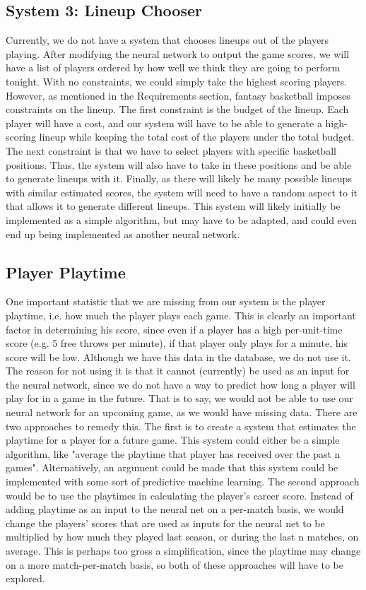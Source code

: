 \subsection{System 3: Lineup Chooser}
Currently, we do not have a system that chooses lineups out of the players playing. After modifying the neural network to output the game scores, we will have a list of players ordered by how well we think they are going to perform tonight. With no constraints, we could simply take the highest scoring players. However, as mentioned in the Requirements section, fantasy basketball imposes constraints on the lineup. The first constraint is the budget of the lineup. Each player will have a cost, and our system will have to be able to generate a high-scoring lineup while keeping the total cost of the players under the total budget. The next constraint is that we have to select players with specific basketball positions. Thus, the system will also have to take in these positions and be able to generate lineups with it. Finally, as there will likely be many possible lineups with similar estimated scores, the system will need to have a random aspect to it that allows it to generate different lineups. %
This system will likely initially be implemented as a simple algorithm, but may have to be adapted, and could even end up being implemented as another neural network.

\subsection{Player Playtime}
One important statistic that we are missing from our system is the player playtime, i.e. how much the player plays each game. This is clearly an important factor in determining his score, since even if a player has a high per-unit-time score (e.g. 5 free throws per minute), if that player only plays for a minute, his score will be low.
Although we have this data in the database, we do not use it. The reason for not using it is that it cannot (currently) be used as an input for the neural network, since we do not have a way to predict how long a player will play for in a game in the future. That is to say, we would not be able to use our neural network for an upcoming game, as we would have missing data. There are two approaches to remedy this. The first is to create a system that estimates the playtime for a player for a future game. This system could either be a simple algorithm, like "average the playtime that player has received over the past n games". Alternatively, an argument could be made that this system could be implemented with some sort of predictive machine learning. The second approach would be to use the playtimes in calculating the player's career score. Instead of adding playtime as an input to the neural net on a per-match basis, we would change the players' scores that are used as inputs for the neural net to be multiplied by how much they played last season, or during the last n matches, on average. This is perhaps too gross a simplification, since the playtime may change on a more match-per-match basis, so both of these approaches will have to be explored.

